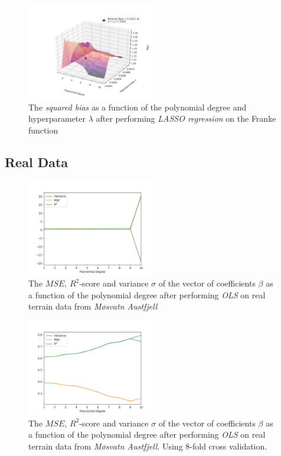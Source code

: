 \documentclass[a4paper,10pt,english]{article}
\begin{document}
\begin{figure}[H]
	\centering 
	\includegraphics[width = 0.5\textwidth, center]{../franke_output/part_E_4.png}
	\caption{The \textit{squared bias} as a function of the polynomial degree and hyperparameter $\lambda$ after performing \textit{LASSO regression} on the Franke function}
	\label{part_e4}
\end{figure}


\subsection*{Real Data}


\begin{figure}[H]
	\centering 
	\includegraphics[width = 0.5\textwidth, center]{../real_output/part_A.png}
	\caption{The $MSE$, $R^2$-score and variance $\sigma$ of the vector of coefficients $\beta$ as a function of the polynomial degree after performing \textit{OLS} on real terrain data from \textit{Møsvatn Austfjell}}
	\label{part_g_a}
\end{figure}

\begin{figure}[H]
	\centering 
	\includegraphics[width = 0.5\textwidth, center]{../real_output/part_B.png}
	\caption{The $MSE$, $R^2$-score and variance $\sigma$ of the vector of coefficients $\beta$ as a function of the polynomial degree after performing \textit{OLS} on real terrain data from \textit{Møsvatn Austfjell}. Using $8$-fold cross validation.}
	\label{part_g_b}
\end{figure}
\end{document}
